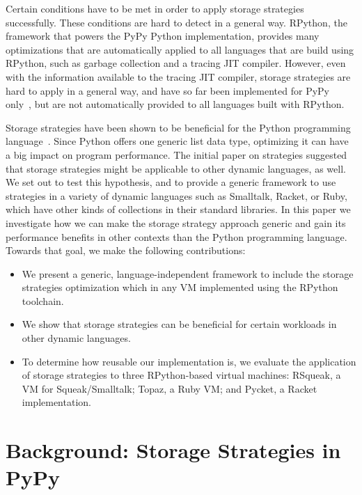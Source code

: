 \documentclass[english,10pt]{sigplanconf}
\begin{document}
Certain conditions have to be met in order to apply storage strategies
successfully. These conditions are hard to detect in a general way. RPython, the
framework that powers the PyPy Python implementation, provides many
optimizations that are automatically applied to all languages that are build
using RPython, such as garbage collection and a tracing JIT compiler. However,
even with the information available to the tracing JIT compiler, storage
strategies are hard to apply in a general way, and have so far been implemented
for PyPy only~\cite{strategies}, but are not automatically provided to all
languages built with RPython.

Storage strategies have been shown to be beneficial for the Python programming
language~\cite{strategies}. Since Python offers one generic list data type,
optimizing it can have a big impact on program performance. The initial paper
on strategies suggested that storage strategies might be applicable to other
dynamic languages, as well. We set out to test this hypothesis, and to
provide a generic framework to use strategies in a variety of dynamic
languages such as Smalltalk, Racket, or Ruby, which have other kinds of
collections in their standard libraries. In this paper we investigate how we
can make the storage strategy approach generic and gain its performance
benefits in other contexts than the Python programming language. Towards that
goal, we make the following contributions:
\begin{itemize}
\item We present a generic, language-independent framework to include the storage
  strategies optimization which in any VM implemented using the
  RPython toolchain.
\item We show that storage strategies can be beneficial for certain workloads in
  other dynamic languages.
\item To determine how reusable our implementation is, we evaluate the 
  application of storage strategies to three RPython-based virtual machines:
  RSqueak, a VM for Squeak/Smalltalk; Topaz, a Ruby VM; and Pycket,
  a Racket implementation.
\end{itemize}

\section{Background: Storage Strategies in PyPy}
\end{document}

